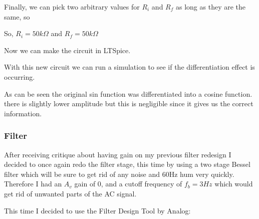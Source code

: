 \documentclass{article}
\begin{document}
Finally, we can pick two arbitrary values for $R_i$ and $R_f$ as long as they are the same, so
\begin{center}
    So, $\boxed{R_i = 50k\Omega}$ and $\boxed{R_f = 50k\Omega}$
\end{center}
Now we can make the circuit in LTSpice.
\begin{center}
\end{center}
With this new circuit we can run a simulation to see if the differentiation effect is occurring.
\begin{center}
\end{center}
As can be seen the original sin function was differentiated into a cosine function. there is slightly lower amplitude but this is negligible since it gives us the correct information.
\newpage
\subsubsection{Filter}
After receiving critique about having gain on my previous filter redesign I decided to once again redo the filter stage, this time by using a two stage Bessel filter which will be sure to get rid of any noise and 60Hz hum very quickly. Therefore I had an $A_v$ gain of 0, and a cutoff frequency of $f_b = 3Hz$ which would get rid of unwanted parts of the AC signal.

This time I decided to use the Filter Design Tool by Analog:
\end{document}
